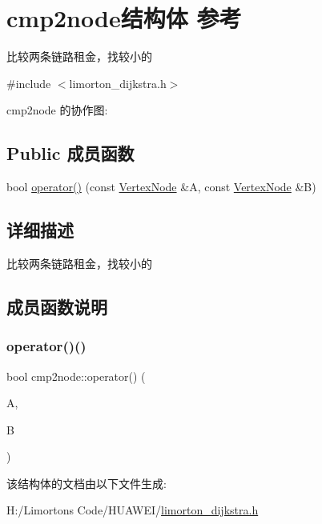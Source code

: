 \hypertarget{structcmp2node}{}\section{cmp2node结构体 参考}
\label{structcmp2node}


比较两条链路租金，找较小的  




{\ttfamily \#include $<$limorton\+\_\+dijkstra.\+h$>$}



cmp2node 的协作图\+:
\subsection*{Public 成员函数}
\begin{DoxyCompactItemize}
\item 
bool \hyperlink{structcmp2node_af40631c9913631aaa1c733b6ac7bb82c}{operator()} (const \hyperlink{struct_vertex_node}{Vertex\+Node} \&A, const \hyperlink{struct_vertex_node}{Vertex\+Node} \&B)
\end{DoxyCompactItemize}


\subsection{详细描述}
比较两条链路租金，找较小的 

\subsection{成员函数说明}
\mbox{\label{structcmp2node_af40631c9913631aaa1c733b6ac7bb82c}} 
\subsubsection{\texorpdfstring{operator()()}{operator()()}}
{\footnotesize\ttfamily bool cmp2node\+::operator() (\begin{DoxyParamCaption}\item[{const \hyperlink{struct_vertex_node}{Vertex\+Node} \&}]{A,  }\item[{const \hyperlink{struct_vertex_node}{Vertex\+Node} \&}]{B }\end{DoxyParamCaption})\hspace{0.3cm}{\ttfamily [inline]}}



该结构体的文档由以下文件生成\+:\begin{DoxyCompactItemize}
\item 
H\+:/\+Limorton\textquotesingle{}s Code/\+H\+U\+A\+W\+E\+I/\hyperlink{limorton__dijkstra_8h}{limorton\+\_\+dijkstra.\+h}\end{DoxyCompactItemize}
